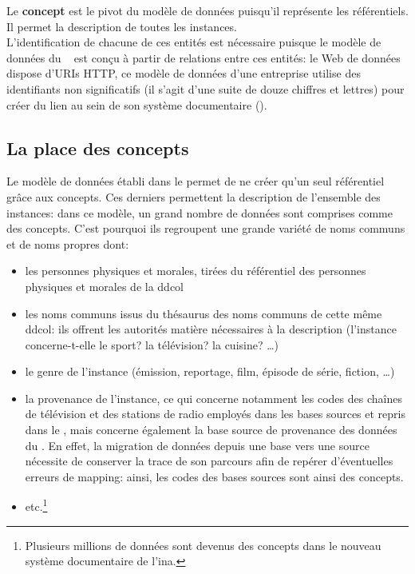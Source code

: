 \noindent Le \textbf{concept} est le pivot du modèle de données puisqu'il représente les référentiels. Il permet la description de toutes les instances.\\

L'identification de chacune de ces entités est nécessaire puisque le modèle de données du \ldd~ est conçu à partir de relations entre ces entités: le Web de données dispose d'URIs HTTP, ce modèle de données d'une entreprise utilise des identifiants non significatifs (il s'agit d'une suite de douze chiffres et lettres) pour créer du lien au sein de son système documentaire ().



\subsection{\label{III-B-2-b}La place des concepts}

Le modèle de données établi dans le \ldd permet de ne créer qu'un seul \og référentiel\fg{} grâce aux concepts. Ces derniers permettent la description de l'ensemble des instances: dans ce modèle, un grand nombre de données sont comprises comme des concepts. C'est pourquoi ils regroupent une grande variété de noms communs et de noms propres dont:
\begin{itemize}
	\item les personnes physiques et morales, tirées du référentiel des personnes physiques et morales de la \ac{ddcol}
	\item les noms communs issus du thésaurus des noms communs de cette même \ac{ddcol}: ils offrent les autorités matière nécessaires à la description (l'instance concerne-t-elle le sport? la télévision? la cuisine? \dots)
	\item  le genre de l'instance (émission, reportage, film, épisode de série, fiction, \dots)
	\item la provenance de l'instance, ce qui concerne notamment les codes des chaînes de télévision et des stations de radio employés dans les bases sources et repris dans le \ldd, mais concerne également la base source de provenance des données du \ldd. En effet, la migration de données depuis une base vers une source nécessite de conserver la trace de son parcours afin de repérer d'éventuelles erreurs de mapping: ainsi, les codes des bases sources sont ainsi des concepts.
	\item etc.\footnote{Plusieurs millions de données sont devenus des concepts dans le nouveau système documentaire de l'\ac{ina}.}
\end{itemize}
\medskip

